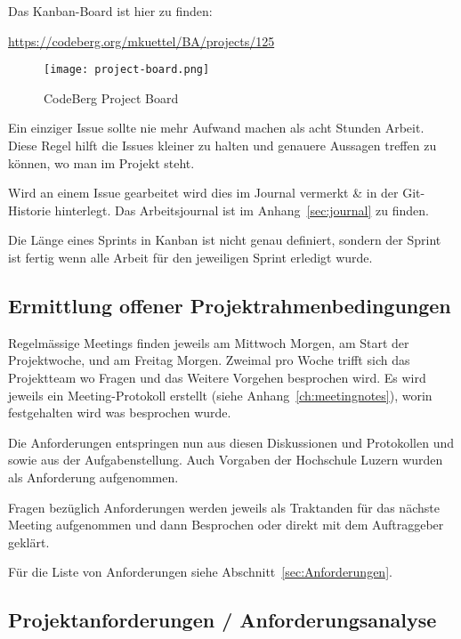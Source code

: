 
Das Kanban-Board ist hier zu finden:

\url{https://codeberg.org/mkuettel/BA/projects/125}



\begin{figure*}[ht]
    \texttt{[image: project-board.png]}
    \caption{CodeBerg Project Board}
    \label{fig:projectboard}
\end{figure*}


Ein einziger Issue sollte nie mehr Aufwand machen als acht Stunden Arbeit. Diese Regel hilft die Issues kleiner zu halten und genauere Aussagen treffen zu können, wo man im Projekt steht.

Wird an einem Issue gearbeitet wird dies im Journal vermerkt \& in der Git-Historie hinterlegt.
Das Arbeitsjournal ist im Anhang~\ref{sec:journal} zu finden.


Die Länge eines Sprints in Kanban ist nicht genau definiert, sondern der Sprint ist fertig wenn alle Arbeit für den jeweiligen Sprint erledigt wurde.

\subsection{Ermittlung offener Projektrahmenbedingungen}
\label{sub:RequirementsEngineering}

Regelmässige Meetings finden jeweils am Mittwoch Morgen, am Start der Projektwoche, und am Freitag Morgen.
Zweimal pro Woche trifft sich das Projektteam wo Fragen und das Weitere
Vorgehen besprochen wird. Es wird jeweils ein Meeting-Protokoll erstellt (siehe
Anhang~\ref{ch:meetingnotes}), worin festgehalten wird was besprochen wurde.

Die Anforderungen entspringen nun aus diesen Diskussionen und Protokollen und sowie aus der Aufgabenstellung.
Auch Vorgaben der Hochschule Luzern wurden als Anforderung aufgenommen.

Fragen bezüglich Anforderungen werden jeweils als Traktanden für das nächste Meeting aufgenommen und dann Besprochen oder direkt mit dem Auftraggeber geklärt.

Für die Liste von Anforderungen siehe Abschnitt~\ref{sec:Anforderungen}.


\subsection{Projektanforderungen / Anforderungsanalyse}
\label{sub:Anforderungen}

